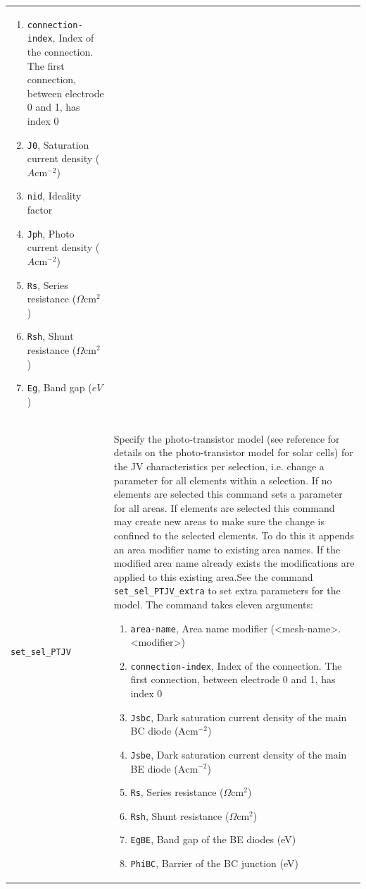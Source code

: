 \documentclass[noshowpacs,preprintnumbers,amsmath,amssymb, letter]{revtex4}
\begin{document}
\begin{longtable}{p{}p{}}
\begin{enumerate}
\item \texttt{connection-index}, Index of the connection. The first connection, between electrode 0 and 1,  has index 0
\item \texttt{J0}, Saturation current density ($A \text{cm}^{-2}$)
\item \texttt{nid}, Ideality factor
\item \texttt{Jph}, Photo current density ($A \text{cm}^{-2}$)
\item \texttt{Rs}, Series resistance ($\Omega \text{cm}^2$)
\item \texttt{Rsh}, Shunt resistance ($\Omega \text{cm}^2$)
\item \texttt{Eg}, Band gap ($eV$)
\end{enumerate}\\
\texttt{set\_sel\_PTJV}	&  Specify the photo-transistor model (see reference \cite{Walter:photo-T} for details on the photo-transistor model for solar cells) for the JV characteristics per selection, i.e. change a parameter for all elements within a selection. If no elements are selected this command sets a parameter for all areas. If elements are selected this command may create new areas to make sure the change is confined to the selected elements. To do this it appends an area modifier name to existing area names. If the modified area name already exists the modifications are applied to this existing area.See the command \texttt{set\_sel\_PTJV\_extra} to set extra parameters for the model. The command takes eleven arguments:
\begin{enumerate}
\item \texttt{area-name},  Area name modifier (\textless mesh-name\textgreater .\textless modifier\textgreater )
\item \texttt{connection-index}, Index of the connection. The first connection, between electrode 0 and 1,  has index 0
\item \texttt{Jsbc},  Dark saturation current density of the main BC diode ($\text{A}\text{cm}^{-2}$)
\item \texttt{Jsbe},  Dark saturation current density of the main BE diode  ($\text{A}\text{cm}^{-2}$)
\item \texttt{Rs}, Series resistance ($\Omega \text{cm}^2$)
\item \texttt{Rsh}, Shunt resistance ($\Omega \text{cm}^2$)
\item \texttt{EgBE},  Band gap of the BE diodes (eV)
\item \texttt{PhiBC},  Barrier of the BC junction (eV)

\end{enumerate}
\end{longtable}
\end{document}
